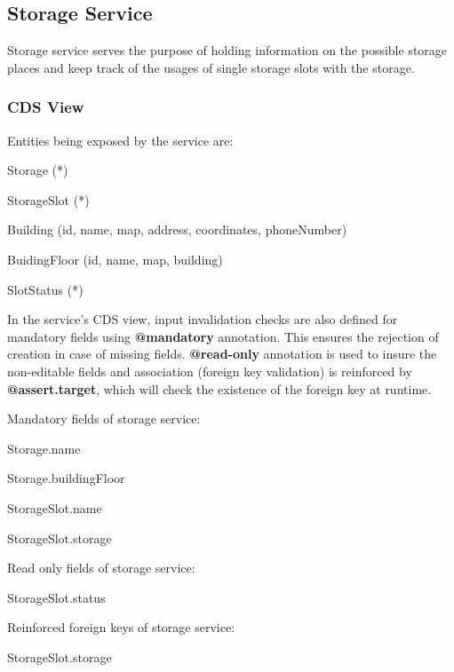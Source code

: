 \subsection{Storage Service}
Storage service serves the purpose of holding information on the possible storage places and keep track of the usages of single storage slots with the storage. 

\subsubsection{CDS View}

Entities being exposed by the service are:
\begin{compactenum}
	\item Storage (*)
    \item StorageSlot (*)
    \item Building (id, name, map, address, coordinates, phoneNumber)
    \item BuidingFloor (id, name, map, building)
    \item SlotStatus (*)
\end{compactenum}

\bigskip
In the service's CDS view, input invalidation checks are also defined for mandatory fields using \textbf{@mandatory} annotation. This ensures the rejection of creation in case of missing fields. \textbf{@read-only} annotation is used to insure the non-editable fields and association (foreign key validation) is reinforced by \textbf{@assert.target}, which will check the existence of the foreign key at runtime.

\bigskip
Mandatory fields of storage service:
\begin{compactenum}
	\item Storage.name
    \item Storage.buildingFloor
    \item StorageSlot.name
    \item StorageSlot.storage
\end{compactenum}

\bigskip
Read only fields of storage service:
\begin{compactenum}
	\item StorageSlot.status
\end{compactenum}

\bigskip
Reinforced foreign keys of storage service:
\begin{compactenum}
	\item StorageSlot.storage
\end{compactenum}

